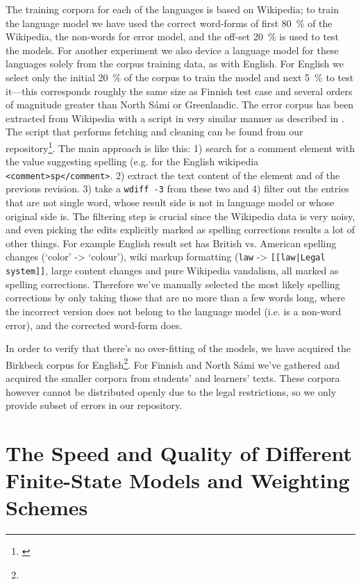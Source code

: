 \documentclass[a4paper,12pt]{article}
\begin{document}
The training corpora for each of the languages is based on Wikipedia; to train
the language model we have used the correct word-forms of first 80~\% of the
Wikipedia, the non-words for error model, and the off-set 20~\% is used to test
the models. For another experiment we also device a language model for these
languages solely from the corpus training data, as with English.  For English
we select only the initial 20~\% of the corpus to train the model and next 5~\%
to test  it---this corresponds roughly
the same size as Finnish test case and several orders of magnitude greater than
North Sámi or Greenlandic. The error corpus has been extracted from Wikipedia
with a script in very similar manner as described in \cite{max2010mining}. The
script that performs fetching and cleaning can be found from our
repository\footnote{\url{}}. The main approach is like this: 1) search for a
comment element with the value suggesting spelling (e.g. for the English
wikipedia \texttt{<comment>sp</comment>}. 2) extract the text content of the
element and of the previous revision. 3) take a \texttt{wdiff -3} from these
two and 4) filter out the entries that are not single word, whose result side
is not in language model or whose original side is.  The filtering step is
crucial since the Wikipedia data is very noisy, and even picking the edits
explicitly marked as spelling corrections results a lot of other things. For
example English result set has British vs.  American spelling changes (`color'
-> `colour'), wiki markup formatting (\texttt{law} -> \texttt{[[law|Legal
system]]}, large content changes and pure Wikipedia vandalism, all marked as
spelling corrections. Therefore we've manually selected the most likely spelling
corrections by only taking those that are no more than a few words long, where
the incorrect version does not belong to the language model (i.e. is a non-word
error), and the corrected word-form does.

In order to verify that there's no over-fitting of the models, we have acquired the 
Birkbeck corpus for English\footnote{}. For Finnish and North Sámi
we've gathered and acquired the smaller corpora from students' and learners' texts.
These corpora however cannot be distributed openly due to the legal restrictions,
so we only provide subset of errors in our repository.

\section{The Speed and Quality of Different Finite-State Models and Weighting
Schemes}
\label{sec:evaluation}
\end{document}
